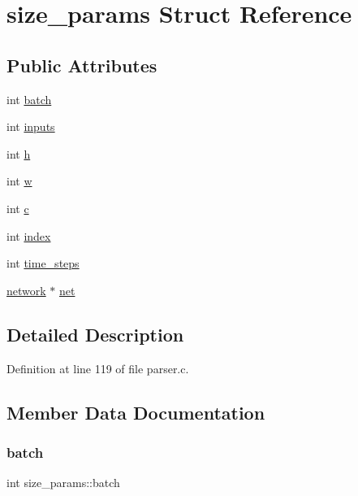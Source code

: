 \hypertarget{structsize__params}{}\section{size\+\_\+params Struct Reference}
\label{structsize__params}
\subsection*{Public Attributes}
\begin{DoxyCompactItemize}
\item 
int \mbox{\hyperlink{structsize__params_ac872965dfd440b79da4db7d613f36ed5}{batch}}
\item 
int \mbox{\hyperlink{structsize__params_ababcd3a740ca14059c55124b38bd1adf}{inputs}}
\item 
int \mbox{\hyperlink{structsize__params_af2cdbb6a29f9aa108d3132fb36895769}{h}}
\item 
int \mbox{\hyperlink{structsize__params_a8497d7dc99707c0993f5a2046c38478f}{w}}
\item 
int \mbox{\hyperlink{structsize__params_aa260a97f277fe40b200756374ffe410d}{c}}
\item 
int \mbox{\hyperlink{structsize__params_a1cc9cfac9ae1198cb6e3683ca228b4e7}{index}}
\item 
int \mbox{\hyperlink{structsize__params_a6d1bb681fb27f447e5428776137a771a}{time\+\_\+steps}}
\item 
\mbox{\hyperlink{structnetwork}{network}} $\ast$ \mbox{\hyperlink{structsize__params_a44ffe1479502733a5b79cb00a1cb2f87}{net}}
\end{DoxyCompactItemize}


\subsection{Detailed Description}


Definition at line 119 of file parser.\+c.



\subsection{Member Data Documentation}
\mbox{\label{structsize__params_ac872965dfd440b79da4db7d613f36ed5}} 
\subsubsection{\texorpdfstring{batch}{batch}}
{\footnotesize\ttfamily int size\+\_\+params\+::batch}



